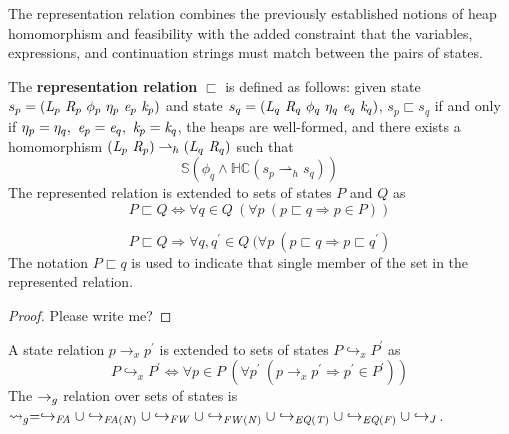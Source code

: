 The representation relation combines the previously established
notions of heap homomorphism and feasibility with the added constraint
that the variables, expressions, and continuation strings must match
between the pairs of states.

\begin{definition}
\label{representation}
The \textbf{representation relation} $\sqsubset$ is defined as
follows: given state $s_p = (
\emph{L}_p\ \emph{R}_p\ \phi_p\ \eta_p\ \emph{e}_p\ \emph{k}_p )$
and state $s_q = (
\emph{L}_q\ \emph{R}_q\ \phi_q\ \eta_q\ \emph{e}_q\ \emph{k}_q )$,
$s_p \sqsubset s_q $ if and only if $\eta_p = \eta_q ,\ \emph{e}_p =
\emph{e}_q ,\ \emph{k}_p = \emph{k}_q$, the heaps are well-formed, and there exists a
homomorphism $(\emph{L}_p\ \emph{R}_p) \rightharpoonup_{h}
(\emph{L}_q\ \emph{R}_q)$ such that
\begin{equation}
\label{eqn:valid}
 \mathbb{S}( \phi_q \wedge \mathbb{HC}(s_p \rightharpoonup_{h} s_q) ) 
\end{equation}
The represented relation is extended to sets of states $P$ and $Q$ as
$$
P \sqsubset Q \Longleftrightarrow \forall q \in Q\ (\forall p\ (p \sqsubset q \Rightarrow p \in P))
$$
\end{definition}

\begin{lemma}
\label{lem:unique}
$$
P \sqsubset Q \Rightarrow \forall q,q^\prime \in Q\ (\forall p\ (p \sqsubset q \Rightarrow p \sqsubset q^\prime)
$$
The notation $P \sqsubset q$ is used to indicate that single member of
the set in the represented relation.
\end{lemma}
\begin{proof}
Please write me?
\end{proof}
\begin{definition}
\label{def:meta}
A state relation $p \rightarrow_x p^\prime$ is extended to sets of states $P \hookrightarrow_x P^\prime$ as
$$
P \hookrightarrow_x P^\prime \Longleftrightarrow \forall p \in P\ (\forall p^\prime\ (p \rightarrow_x p^\prime \Rightarrow p^\prime \in P^\prime))
$$
The $\rightarrow_{g}$ relation over sets of states is $\leadsto_{g} = \hookrightarrow_\mathit{FA} \cup \hookrightarrow_\mathit{FA(N)} \cup \hookrightarrow_\mathit{FW} \cup \hookrightarrow_\mathit{FW(N)} \cup \hookrightarrow_\mathit{EQ(T)} \cup \hookrightarrow_\mathit{EQ(F)} \cup \hookrightarrow_{J}$.%
\end{definition}

